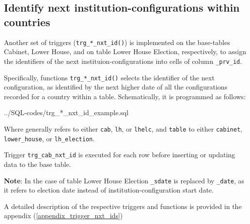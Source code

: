 \subsection{Identify next institution-configurations within countries}\label{trg_prv_ids}
Another set of triggers (\texttt{\footnotesize trg\_*\_nxt\_id()}) is implemented on the base-tables Cabinet, Lower House, and on table Lower House Election, respectively, to assign the identifiers of the next instituion-configurations into cells of column \texttt{\footnotesize *\_prv\_id}.

Specifically, functions \texttt{\footnotesize trg\_*\_nxt\_id()} selects the identifier of the next  configuration, as identified by the next higher date of all the configurations recorded for a country within a table.
Schematically, it is programmed as follows:

%
{../SQL-codes/trg_*_nxt_id_example.sql}

Where generally \texttt{\footnotesize *} refers to either \texttt{\footnotesize cab}, \texttt{\footnotesize lh}, or \texttt{\footnotesize lhelc}, and \texttt{\footnotesize *table} to either \texttt{\footnotesize cabinet}, \texttt{\footnotesize lower\_house}, or \texttt{\footnotesize lh\_election}.

Trigger \texttt{\footnotesize trg\_cab\_nxt\_id} is executed for each row before inserting or updating data to the base table.

{\bf Note}: In the case of table Lower House Election \texttt{\footnotesize \_sdate} is replaced by \texttt{\footnotesize \_date}, as it refers to election date instead of institution-configuration start date.

A detailed description of the respective triggers and functions is provided in the appendix (\ref{appendix_trigger_nxt_ids})
